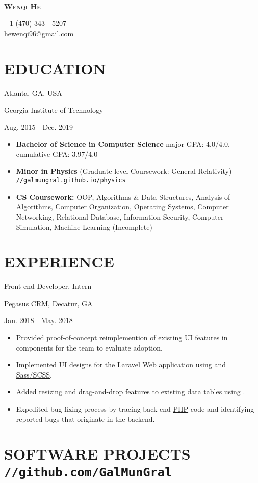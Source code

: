 \documentclass[11pt]{article}
\newcommand{\centertitle}[3]{
	{\noindent\bfseries
	\parbox[][0.5em][b]{0.35\textwidth}{#1\hfill}%
	\parbox[][0.5em][b]{0.3\textwidth}{\centerline{#2}}%
	\parbox[][0.5em][b]{0.35\textwidth}{\hfill#3}}
}
\begin{document}
\noindent
\parbox{0.2\textwidth}{\,}
\parbox{0.6\textwidth}{\centerline{\huge\scshape\bfseries Wenqi He}}
\parbox{0.2\textwidth}{+1 (470) 343 - 5207 \\hewenqi96@gmail.com}

\section*{EDUCATION}
\centertitle{Atlanta, GA, USA}{Georgia Institute of Technology}{Aug. 2015 - Dec. 2019}
\begin{itemize}[leftmargin=15pt, noitemsep, topsep=0pt]
\item \textbf{Bachelor of Science in Computer Science} \hfill major GPA: 4.0/4.0, cumulative GPA: 3.97/4.0
\item \textbf{Minor in Physics} (Graduate-level Coursework: General Relativity) \hfill \texttt{//galmungral.github.io/physics}
\item \textbf{CS Coursework:} OOP, Algorithms \& Data Structures, Analysis of Algorithms, Computer Organization, Operating Systems, Computer Networking, Relational Database, Information Security, Computer Simulation, Machine Learning (Incomplete)
\end{itemize}
\vspace{-0.5em}

\section*{EXPERIENCE}
\centertitle{Front-end Developer, Intern}{Pegasus CRM, Decatur, GA}{Jan. 2018 - May. 2018}
\begin{itemize}[leftmargin=15pt, noitemsep, topsep=0pt]
\item Provided proof-of-concept reimplemention of existing UI features in \underline{} components for the team to evaluate adoption.
\item Implemented UI designs for the Laravel Web application using \underline{} and \underline{Sass/SCSS}. 
\item Added resizing and drag-and-drop features to existing data tables using \underline{}.
\item Expedited bug fixing process by tracing back-end \underline{PHP} code and identifying reported bugs that originate in the backend.
\end{itemize}
\vspace{-0.5em}

\section*{SOFTWARE PROJECTS \hfill \normalsize\texttt{//github.com/GalMunGral}}
\end{document}
